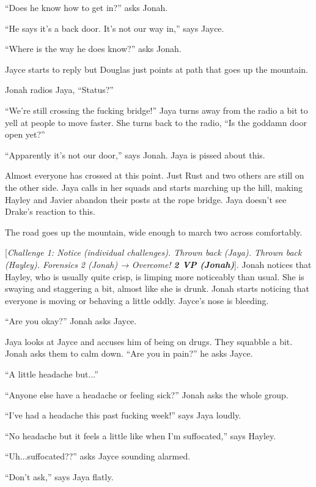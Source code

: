 ``Does he know how to get in?'' asks Jonah.

``He says it's a back door.  It's not our way in,'' says Jayce.

``Where is the way he does know?'' asks Jonah.

Jayce starts to reply but Douglas just points at path that goes up the mountain.

Jonah radios Jaya, ``Status?''

``We're still crossing the fucking bridge!''  Jaya turns away from the radio a bit to yell at people to move faster.  She turns back to the radio, ``Is the goddamn door open yet?''

``Apparently it's not our door,'' says Jonah.  Jaya is pissed about this.

Almost everyone has crossed at this point.  Just Rust and two others are still on the other side.  Jaya calls in her squads and starts marching up the hill, making Hayley and Javier abandon their posts at the rope bridge.  Jaya doesn't see Drake's reaction to this.





The road goes up the mountain, wide enough to march two across comfortably. 

{[}\textit{Challenge 1: Notice (individual challenges).  Thrown back (Jaya).  Thrown back (Hayley).  Forensics 2 (Jonah) → Overcome! }\textit{\textbf{2 VP (Jonah)}}{]}.  Jonah notices that Hayley, who is usually quite crisp, is limping more noticeably than usual.  She is swaying and staggering a bit, almost like she is drunk.  Jonah starts noticing that everyone is moving or behaving a little oddly.  Jayce's nose is bleeding.

``Are you okay?'' Jonah asks Jayce.

Jaya looks at Jayce and accuses him of being on drugs.  They squabble a bit.  Jonah asks them to calm down.  ``Are you in pain?'' he asks Jayce.

``A little headache but...''

``Anyone else have a headache or feeling sick?'' Jonah asks the whole group.

``I've had a headache this past fucking week!'' says Jaya loudly.

``No headache but it feels a little like when I'm suffocated,'' says Hayley.

``Uh...suffocated??'' asks Jayce sounding alarmed.

``Don't ask,'' says Jaya flatly.


